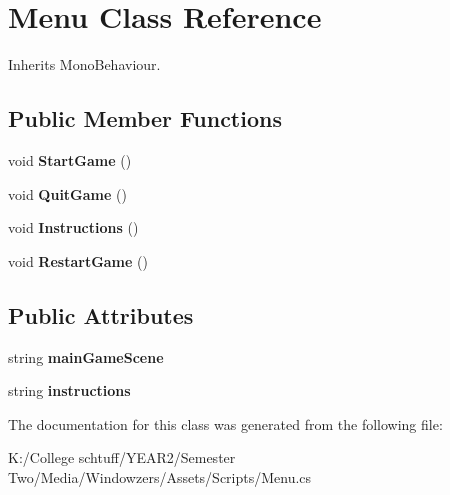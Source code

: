 \hypertarget{class_menu}{}\section{Menu Class Reference}
\label{class_menu}


Inherits Mono\+Behaviour.

\subsection*{Public Member Functions}
\begin{DoxyCompactItemize}
\item 
\mbox{\label{class_menu_a4498394b6a2d21c26cea20231909ac8a}} 
void {\bfseries Start\+Game} ()
\item 
\mbox{\label{class_menu_a89c08f92cd5cc738e6e4f4e0b492d485}} 
void {\bfseries Quit\+Game} ()
\item 
\mbox{\label{class_menu_aeac2a8e674f62f3b82f654c278c2b47a}} 
void {\bfseries Instructions} ()
\item 
\mbox{\label{class_menu_aac387c44a4f99f32e891be7b8d966892}} 
void {\bfseries Restart\+Game} ()
\end{DoxyCompactItemize}
\subsection*{Public Attributes}
\begin{DoxyCompactItemize}
\item 
\mbox{\label{class_menu_ab6e3e5deb1a3a4cf79e5f79ac7e72d61}} 
string {\bfseries main\+Game\+Scene}
\item 
\mbox{\label{class_menu_a42040e77d772e36fb0775b5f4060b86c}} 
string {\bfseries instructions}
\end{DoxyCompactItemize}


The documentation for this class was generated from the following file\+:\begin{DoxyCompactItemize}
\item 
K\+:/\+College schtuff/\+Y\+E\+A\+R2/\+Semester Two/\+Media/\+Windowzers/\+Assets/\+Scripts/Menu.\+cs\end{DoxyCompactItemize}
